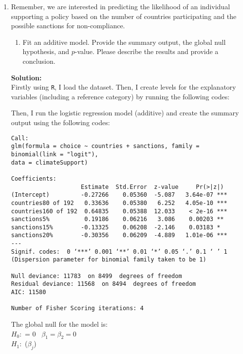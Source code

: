\documentclass[12pt,letterpaper]{article}
\begin{document}
\begin{enumerate}
	\item
	Remember, we are interested in predicting the likelihood of an individual supporting a policy based on the number of countries participating and the possible sanctions for non-compliance.
	\begin{enumerate}
		\item [] Fit an additive model. Provide the summary output, the global null hypothesis, and $p$-value. Please describe the results and provide a conclusion.
		\end{enumerate}

\vspace*{.2cm}
\noindent\textbf{Solution:\\}
Firstly using \texttt{R}, I load the dataset. Then, I create levels for the explanatory variables (including a reference category) by running the following codes:


\noindent Then, I run the logistic regression model (additive) and create the summary output using the following codes:


\begin{Verbatim}
Call:
glm(formula = choice ~ countries + sanctions, family = binomial(link = "logit"), 
data = climateSupport)

Coefficients:
                    Estimate  Std.Error  z-value     Pr(>|z|)    
(Intercept)         -0.27266    0.05360  -5.087   3.64e-07 ***
countries80 of 192   0.33636    0.05380   6.252   4.05e-10 ***
countries160 of 192  0.64835    0.05388  12.033    < 2e-16 ***
sanctions5%          0.19186    0.06216   3.086    0.00203 ** 
sanctions15%        -0.13325    0.06208  -2.146    0.03183 *  
sanctions20%        -0.30356    0.06209  -4.889   1.01e-06 ***
---
Signif. codes:  0 ‘***’ 0.001 ‘**’ 0.01 ‘*’ 0.05 ‘.’ 0.1 ‘ ’ 1
(Dispersion parameter for binomial family taken to be 1)
	
Null deviance: 11783  on 8499  degrees of freedom
Residual deviance: 11568  on 8494  degrees of freedom
AIC: 11580

Number of Fisher Scoring iterations: 4
\end{Verbatim}

The global null for the model is:\\
$H_0:$  = 0 \,  $\beta_1 = \beta_2 = 0$\\
$H_1:$  ($\beta_j$) \\


\end{enumerate}
\end{document}
